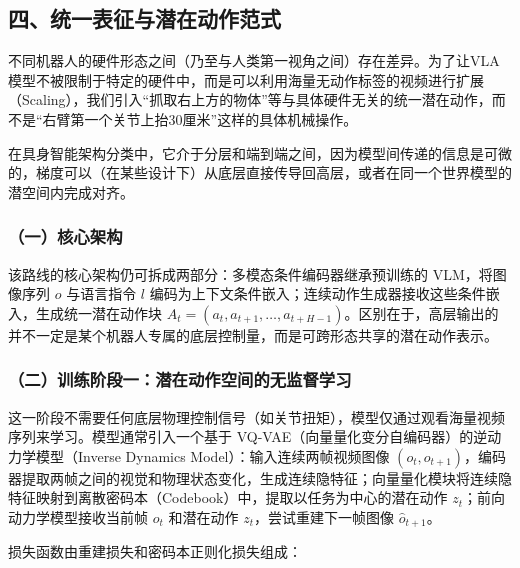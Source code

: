 \hypertarget{ux56dbux7edfux4e00ux8868ux5f81ux4e0eux6f5cux5728ux52a8ux4f5cux8303ux5f0f}{%
\subsection{四、统一表征与潜在动作范式}\label{ux56dbux7edfux4e00ux8868ux5f81ux4e0eux6f5cux5728ux52a8ux4f5cux8303ux5f0f}}

不同机器人的硬件形态之间（乃至与人类第一视角之间）存在差异。为了让VLA模型不被限制于特定的硬件中，而是可以利用海量无动作标签的视频进行扩展（Scaling），我们引入``抓取右上方的物体''等与具体硬件无关的统一潜在动作，而不是``右臂第一个关节上抬30厘米''这样的具体机械操作。

在具身智能架构分类中，它介于分层和端到端之间，因为模型间传递的信息是可微的，梯度可以（在某些设计下）从底层直接传导回高层，或者在同一个世界模型的潜空间内完成对齐。

\hypertarget{ux4e00ux6838ux5fc3ux67b6ux6784}{%
\subsubsection{（一）核心架构}\label{ux4e00ux6838ux5fc3ux67b6ux6784}}

该路线的核心架构仍可拆成两部分：多模态条件编码器继承预训练的 VLM，将图像序列 \(o\) 与语言指令 \(l\) 编码为上下文条件嵌入；连续动作生成器接收这些条件嵌入，生成统一潜在动作块 \(A_t=(a_t,a_{t+1},\ldots,a_{t+H-1})\)。区别在于，高层输出的并不一定是某个机器人专属的底层控制量，而是可跨形态共享的潜在动作表示。

\hypertarget{ux4e8cux8badux7ec3ux9636ux6bb5ux4e00ux6f5cux5728ux52a8ux4f5cux7a7aux95f4ux7684ux65e0ux76d1ux7763ux5b66ux4e60}{%
\subsubsection{（二）训练阶段一：潜在动作空间的无监督学习}\label{ux4e8cux8badux7ec3ux9636ux6bb5ux4e00ux6f5cux5728ux52a8ux4f5cux7a7aux95f4ux7684ux65e0ux76d1ux7763ux5b66ux4e60}}

这一阶段不需要任何底层物理控制信号（如关节扭矩），模型仅通过观看海量视频序列来学习。模型通常引入一个基于 VQ-VAE（向量量化变分自编码器）的逆动力学模型（Inverse Dynamics Model）：输入连续两帧视频图像 \((o_t,o_{t+1})\)，编码器提取两帧之间的视觉和物理状态变化，生成连续隐特征；向量量化模块将连续隐特征映射到离散密码本（Codebook）中，提取以任务为中心的潜在动作 \(z_t\)；前向动力学模型接收当前帧 \(o_t\) 和潜在动作 \(z_t\)，尝试重建下一帧图像 \(\hat{o}_{t+1}\)。

损失函数由重建损失和密码本正则化损失组成：

